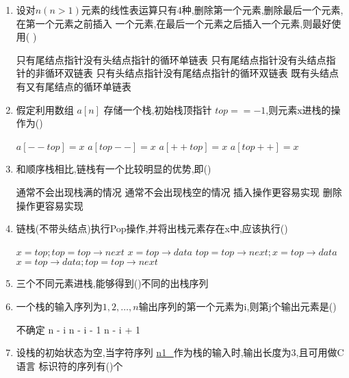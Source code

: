\documentclass[12pt, a4paper, oneside, UTF8]{ctexbook}
\begin{document}
\begin{enumerate}
    \item 设对$n(n>1)$元素的线性表运算只有4种,删除第一个元素,删除最后一个元素,在第一个元素之前插入
    一个元素,在最后一个元素之后插入一个元素,则最好使用(    ) 
    \begin{choices}[1]
        \task 只有尾结点指针没有头结点指针的循环单链表
        \task 只有尾结点指针没有头结点指针的非循环双链表
        \task 只有头结点指针没有尾结点指针的循环双链表
        \task 既有头结点有又有尾结点的循环单链表
    \end{choices}


    \item 假定利用数组 $a[n]$ 存储一个栈,初始栈顶指针 $top==-1$,则元素x进栈的操作为() 
    \begin{choices}
        \task $a[--top] = x$ 
        \task $a[top--] = x$
        \task $a[++top] = x$
        \task $a[top++] = x$
    \end{choices}

    \item 和顺序栈相比,链栈有一个比较明显的优势,即() 
    \begin{choices}[2]
        \task 通常不会出现栈满的情况 
        \task 通常不会出现栈空的情况 
        \task 插入操作更容易实现 
        \task 删除操作更容易实现 
    \end{choices}


    \item 链栈(不带头结点)执行Pop操作,并将出栈元素存在x中,应该执行() 
    \begin{choices}[2]
        \task $x=top;top=top\rightarrow next$ 
        \task $x=top\rightarrow data$ 
        \task $top=top\rightarrow next;x=top\rightarrow data$
        \task $x=top\rightarrow data;top=top\rightarrow next$ 
    \end{choices}

    \item 三个不同元素进栈,能够得到()不同的出栈序列 


    \item 一个栈的输入序列为$1,2,\ldots,n$输出序列的第一个元素为i,则第j个输出元素是() 
    \begin{choices}
        \task 不确定
        \task n - i 
        \task n - i - 1
        \task n - i + 1
    \end{choices}


    \item 设栈的初始状态为空,当字符序列 \underline{n1\_}作为栈的输入时,输出长度为3,且可用做C语言
    标识符的序列有()个
    \begin{choices}
    \end{choices}



\end{enumerate}
\end{document}
